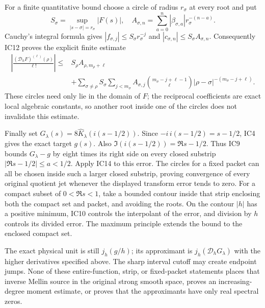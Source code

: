\documentclass[11pt]{article}
\begin{document}
For a finite quantitative bound choose a circle of radius $r_\sigma$
at every root and put
\[
 S_\sigma=\sup_{|s-\sigma|=r_\sigma}|F(s)|,
 \quad A_{\sigma,n}=\sum_{a=0}^n|\beta_{\sigma,a}|r_\sigma^{-(n-a)}.
\]
Cauchy's integral formula gives
$|f_{\sigma,j}|\le S_\sigma r_\sigma^{-j}$ and
$|c_{\sigma,n}|\le S_\sigma A_{\sigma,n}$. Consequently IC12
proves the explicit finite estimate
\begin{equation}\tag{IC14}
 \begin{split}
 \left|\frac{(\mathcal D_hF)^{(\ell)}(\rho)}{\ell!}\right|
 \le{}&S_\rho A_{\rho,m_\rho+\ell}\\
 &+\sum_{\sigma\ne\rho}S_\sigma\sum_{j<m_\sigma}
 A_{\sigma,j}\binom{m_\sigma-j+\ell-1}{\ell}
 |\rho-\sigma|^{-(m_\sigma-j+\ell)}.
 \end{split}
\end{equation}
These circles need only lie in the domain of $F$; the reciprocal
coefficients are exact local algebraic constants, so another root
inside one of the circles does not invalidate this estimate.

Finally set $G_\lambda(s)=8\widehat K_\lambda(i(s-1/2))$.
Since $-i\,i(s-1/2)=s-1/2$, IC4 gives the exact target $g(s)$.
Also $\Im(i(s-1/2))=\Re s-1/2$. Thus IC9 bounds
$G_\lambda-g$ by eight times its right side on every closed
substrip $|\Re s-1/2|\le a<1/2$. Apply IC14 to this error.
The circles for a fixed packet can all be chosen inside such
a larger closed substrip, proving convergence of every original
quotient jet whenever the displayed transform error tends to zero.
For a compact subset of $0<\Re s<1$, take a bounded contour
inside that strip enclosing both the compact set and packet,
and avoiding the roots. On the contour $|h|$ has a positive
minimum, IC10 controls the interpolant of the error, and division
by $h$ controls its divided error. The maximum principle extends
the bound to the enclosed compact set.

The exact physical unit is still $j_h(g/h)$; its approximant is
$j_h(\mathcal D_hG_\lambda)$ with the higher derivatives specified
above. The sharp interval cutoff may create endpoint jumps.
None of these entire-function, strip, or fixed-packet statements
places that inverse Mellin source in the original strong smooth
space, proves an increasing-degree moment estimate, or proves
that the approximants have only real spectral zeros.
\end{document}
